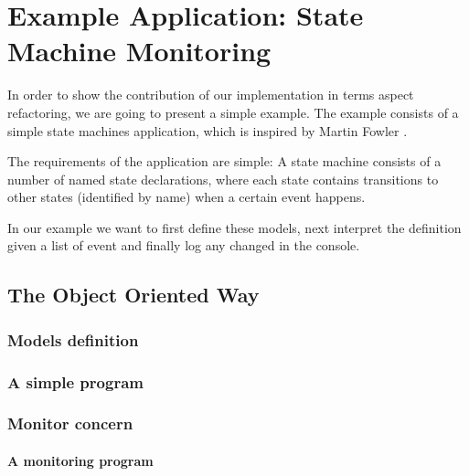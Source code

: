
\chapter{Example Application: State Machine Monitoring}\label{Example Application}
In order to show the contribution of our implementation in terms aspect refactoring, we are going to present a simple example.
The example consists of a simple state machines application, which is inspired by Martin Fowler \cite{fowler2010domain}.

The requirements of the application are simple: A state machine consists of a number of named state declarations, where each state contains transitions to other states (identified by name) when a certain event happens.

In our example we want to first define these models, next interpret the definition given a list of event and finally log any changed in the console.

\section{The Object Oriented Way}

\subsection{Models definition}

\subsection{A simple program}

\subsection{Monitor concern}

\subsubsection{A monitoring program}

